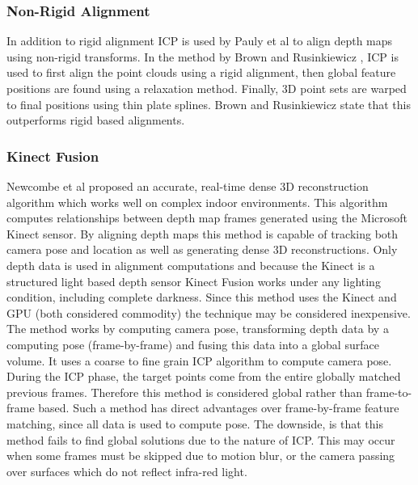 \subsubsection{Non-Rigid Alignment}

In addition to rigid alignment ICP is used by Pauly et al \cite{Pauly05Example,Brown07Global} to align depth maps using non-rigid transforms. In the method by Brown and Rusinkiewicz \cite{Brown07Global}, ICP is used to first align the point clouds using a rigid alignment, then global feature positions are found using a relaxation method. Finally, 3D point sets are warped to final positions using thin plate splines. Brown and Rusinkiewicz state that this outperforms rigid based alignments.


\subsubsection{Kinect Fusion}

Newcombe et al \cite{Newcombe11Kinectfusion,Izadi11Kinectfusion} proposed an accurate, real-time dense 3D reconstruction algorithm which works well on complex indoor environments. This algorithm computes relationships between depth map frames generated using the Microsoft Kinect \cite{Zhang12Microsoft} sensor. By aligning depth maps this method is capable of tracking both camera pose and location as well as generating dense 3D reconstructions. Only depth data is used in alignment computations and because the Kinect is a structured light based depth sensor Kinect Fusion works under any lighting condition, including complete darkness. Since this method uses the Kinect and GPU (both considered commodity) the technique may be considered inexpensive. \\

The method works by computing camera pose, transforming depth data by a computing pose (frame-by-frame) and fusing this data into a global surface volume. It uses a coarse to fine grain ICP algorithm to compute camera pose. During the ICP phase, the target points come from the entire globally matched previous frames. Therefore this method is considered global rather than frame-to-frame based. Such a method has direct advantages over frame-by-frame feature matching, since all data is used to compute pose. The downside, is that this method fails to find global solutions due to the nature of ICP. This may occur when some frames must be skipped due to motion blur, or the camera passing over surfaces which do not reflect infra-red light. \\

